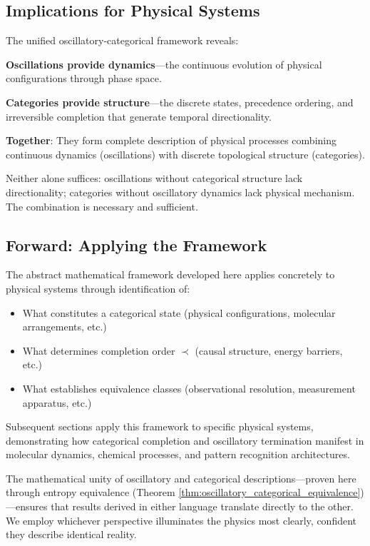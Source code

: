 \documentclass[11pt]{article}
\theoremstyle{remark}
\begin{document}
\subsection{Implications for Physical Systems}

The unified oscillatory-categorical framework reveals:

\textbf{Oscillations provide dynamics}—the continuous evolution of physical configurations through phase space.

\textbf{Categories provide structure}—the discrete states, precedence ordering, and irreversible completion that generate temporal directionality.

\textbf{Together}: They form complete description of physical processes combining continuous dynamics (oscillations) with discrete topological structure (categories).

Neither alone suffices: oscillations without categorical structure lack directionality; categories without oscillatory dynamics lack physical mechanism. The combination is necessary and sufficient.

\subsection{Forward: Applying the Framework}

The abstract mathematical framework developed here applies concretely to physical systems through identification of:
\begin{itemize}
\item What constitutes a categorical state (physical configurations, molecular arrangements, etc.)
\item What determines completion order $\prec$ (causal structure, energy barriers, etc.)
\item What establishes equivalence classes (observational resolution, measurement apparatus, etc.)
\end{itemize}

Subsequent sections apply this framework to specific physical systems, demonstrating how categorical completion and oscillatory termination manifest in molecular dynamics, chemical processes, and pattern recognition architectures.

The mathematical unity of oscillatory and categorical descriptions—proven here through entropy equivalence (Theorem \ref{thm:oscillatory_categorical_equivalence})—ensures that results derived in either language translate directly to the other. We employ whichever perspective illuminates the physics most clearly, confident they describe identical reality.
\end{document}
